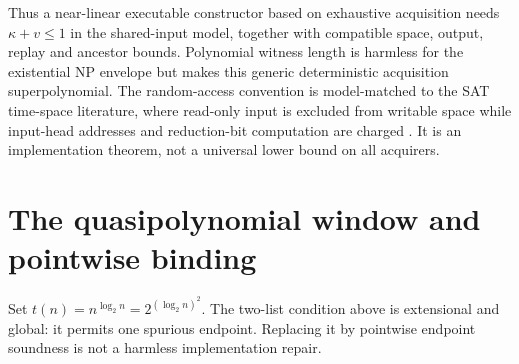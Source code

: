 \documentclass[11pt]{article}
\begin{document}
Thus a near-linear executable constructor based on exhaustive acquisition
needs \(\kappa+v\le1\) in the shared-input model, together with compatible
space, output, replay and ancestor bounds.  Polynomial witness length is
harmless for the existential NP envelope but makes this generic deterministic
acquisition superpolynomial.  The random-access convention is model-matched
to the SAT time-space literature, where read-only input is excluded from
writable space while input-head addresses and reduction-bit computation are
charged \cite{flmv2005}.  It is an implementation theorem, not a universal
lower bound on all acquirers.

\section{The quasipolynomial window and pointwise binding}
Set \(t(n)=n^{\log_2 n}=2^{(\log_2 n)^2}\).  The two-list condition above is
extensional and global: it permits one spurious endpoint.  Replacing it by
pointwise endpoint soundness is not a harmless implementation repair.
\end{document}
